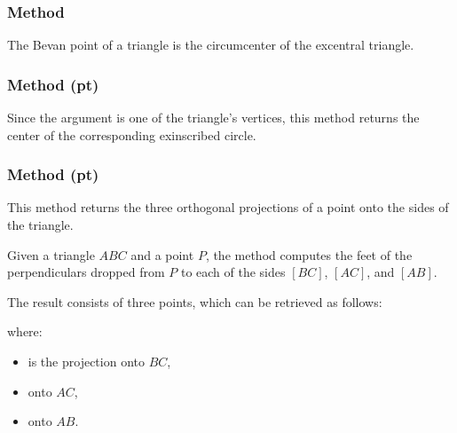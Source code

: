 \subsubsection{Method }
\label{ssub:method_imeth_triangle_bevan_point}
The Bevan point of a triangle  is the circumcenter of the excentral triangle.

\begin{tkzexample}[latex=.5\textwidth]
\end{tkzexample}

\subsubsection{Method (pt)}
\label{ssub:method_triangle_excenter_pt}
Since the argument is one of the triangle's vertices, this method returns the center of the corresponding exinscribed circle.

\subsubsection{Method (pt)}
\label{ssub:method_triangle_projection_pt}

This method returns the three orthogonal projections of a point onto the sides of the triangle.

\medskip
\noindent
Given a triangle $ABC$ and a point $P$, the method computes the feet of the perpendiculars dropped from $P$ to each of the sides $[BC]$, $[AC]$, and $[AB]$.

\medskip
\noindent
The result consists of three points, which can be retrieved as follows:
\begin{mybox}
\end{mybox}
where:
\begin{itemize}
  \item {} is the projection onto $BC$,
  \item {} onto $AC$,
  \item {} onto $AB$.
\end{itemize}

